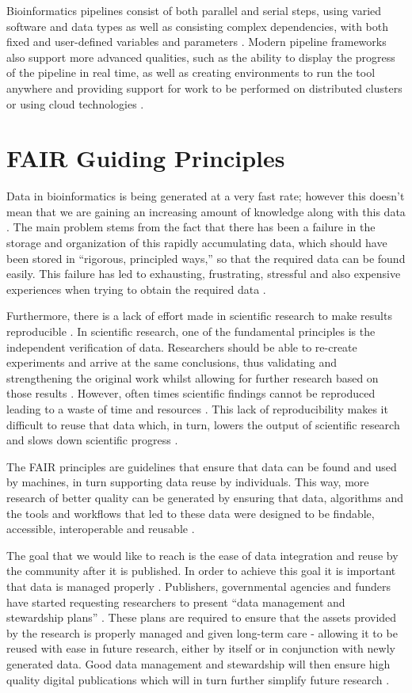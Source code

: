 \documentclass{cisfyp}
\begin{document}
Bioinformatics pipelines consist of both parallel and serial steps, using varied software and data types as well as consisting complex dependencies, with both fixed and user-defined variables and parameters \cite{Leipzig2016}. Modern pipeline frameworks also support more advanced qualities, such as the ability to display the progress of the pipeline in real time, as well as creating environments to run the tool anywhere and providing support for work to be performed on distributed clusters or using cloud technologies \cite{Leipzig2016}.

\section{FAIR Guiding Principles}
Data in bioinformatics is being generated at a very fast rate; however this doesn't mean that we are gaining an increasing amount of knowledge along with this data \cite{Wittig2017}. The main problem stems from the fact that there has been a failure in the storage and organization of this rapidly accumulating data, which should have been stored in ``rigorous, principled ways,'' \cite{Attwood2009} so that the required data can be found easily. This failure has led to exhausting, frustrating, stressful and also expensive experiences when trying to obtain the required data \cite{Attwood2009}.

Furthermore, there is a lack of effort made in scientific research to make results reproducible \cite{nature}. In scientific research, one of the fundamental principles is the independent verification of data. Researchers should be able to re-create experiments and arrive at the same conclusions, thus validating and strengthening the original work whilst allowing for further research based on those results \cite{nature}. However, often times scientific findings cannot be reproduced leading to a waste of time and resources \cite{nature}. This lack of reproducibility makes it difficult to reuse that data which, in turn, lowers the output of scientific research and slows down scientific progress \cite{nature}.

The FAIR principles are guidelines that ensure that data can be found and used by machines, in turn supporting data reuse by individuals. This way, more research of better quality can be generated by ensuring that data, algorithms and the tools and workflows that led to these data were designed to be findable, accessible, interoperable and reusable \cite{2016}.

The goal that we would like to reach is the ease of data integration and reuse by the community after it is published. In order to achieve this goal it is important that data is managed properly \cite{Wilkinson2016}. Publishers, governmental agencies and funders have started requesting researchers to present ``data management and stewardship plans'' \cite{Wilkinson2016}. These plans are required to ensure that the assets provided by the research is properly managed and given long-term care - allowing it to be reused with ease in future research, either by itself or in conjunction with newly generated data. Good data management and stewardship will then ensure high quality digital publications which will in turn further simplify future research \cite{Wilkinson2016}. 
\end{document}
